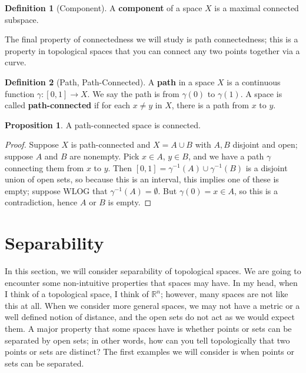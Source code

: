 \documentclass[11pt, oneside]{amsart}   	%
\theoremstyle{definition}
\newtheorem{definition}{Definition}[section]
\newtheorem{prop}{Proposition}[section]
\begin{document}
	\begin{definition}[Component]
		A \textbf{component} of a space $X$ is a maximal connected subspace. 
	\end{definition}
	
	The final property of connectedness we will study is path connectedness; this is a property in topological spaces that you can connect any two points together 
	via a curve.
	
	\begin{definition}[Path, Path-Connected]
		A \textbf{path} in a space $X$ is a continuous function $\gamma : [0, 1]\rightarrow X$. We say the path is from $\gamma(0)$ to $\gamma(1)$. A 
		space is called \textbf{path-connected} if for each $x\neq y$ in $X$, there is a path from $x$ to $y$.
	\end{definition}
	
	\begin{prop}
		A path-connected space is connected.
	\end{prop}
	
	\begin{proof}
		Suppose $X$ is path-connected and $X = A\cup B$ with $A, B$ disjoint and open; suppose $A$ and $B$ are nonempty. Pick $x\in A$, $y\in B$, and we 
		have a path $\gamma$ connecting them from $x$ to $y$. Then $[0, 1] = \gamma^{-1}(A)\cup\gamma^{-1}(B)$ is a disjoint union of open sets, so 
		because this is an interval, this implies one of these is empty; suppose WLOG that $\gamma^{-1}(A) = \emptyset$. But $\gamma(0) = x\in A$, so 
		this is a contradiction, hence $A$ or $B$ is empty.
	\end{proof}

\newpage

\section{Separability}

	In this section, we will consider separability of topological spaces. We are going to encounter some non-intuitive 
	properties that spaces may have. In my head, when I think of a topological space, I think of $\mathbb R^n$; however, 
	many spaces are not like this at all. When we consider more general spaces, we may not have a metric or a well defined 
	notion of distance, and the open sets do not act as we would expect them. A major property that some spaces have is 
	whether points or sets can be separated by open sets; in other words, how can you tell topologically that two points or 
	sets are distinct? The first examples we will consider is when points or sets can be separated.
	
\end{document}
